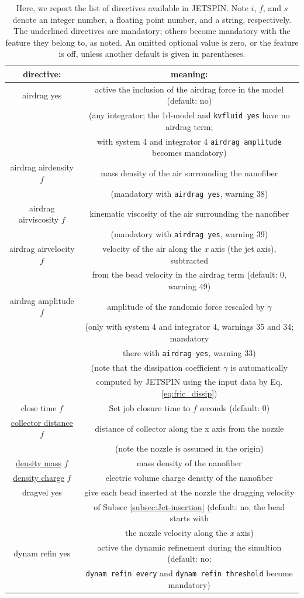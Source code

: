 \begin{longtable}{cc}
\caption{Here, we report the list of directives available in JETSPIN. Note
$i$, $f$, and $s$ denote an integer number, a floating point number,
and a string, respectively. The underlined directives are mandatory;
others become mandatory with the feature they belong to, as noted.
An omitted optional value is zero, or the feature is off, unless another
default is given in parentheses.}
\tabularnewline
\endlastfoot
\hline
\textbf{directive:}  & \textbf{meaning:}\tabularnewline
\hline
\hline
airdrag yes  & active the inclusion of the airdrag force in the model (default: no)\tabularnewline
 & (any integrator; the 1d-model and \texttt{kvfluid yes} have no airdrag term;\tabularnewline
 & with system 4 and integrator 4 \texttt{airdrag amplitude} becomes mandatory)\tabularnewline
airdrag airdensity $f$  & mass density of the air surrounding the nanofiber\tabularnewline
 & (mandatory with \texttt{airdrag yes}, warning 38)\tabularnewline
airdrag airviscosity $f$  & kinematic viscosity of the air surrounding the nanofiber\tabularnewline
 & (mandatory with \texttt{airdrag yes}, warning 39)\tabularnewline
airdrag airvelocity $f$  & velocity of the air along the \textit{x} axis (the jet axis), subtracted\tabularnewline
 & from the bead velocity in the airdrag term (default: 0, warning 49)\tabularnewline
airdrag amplitude $f$  & amplitude of the randomic force rescaled by $\gamma$\tabularnewline
 & (only with system 4 and integrator 4, warnings 35 and 34; mandatory\tabularnewline
 & there with \texttt{airdrag yes}, warning 33)\tabularnewline
 & (note that the dissipation coefficient $\gamma$ is automatically\tabularnewline
 & computed by JETSPIN using the input data by Eq. \ref{eq:fric_dissip})\tabularnewline
close time $f$ & Set job closure time to $f$ seconds (default: 0)\tabularnewline
\uline{collector distance} $f$  & distance of collector along the x axis from the nozzle\tabularnewline
 & \quad{}(note the nozzle is assumed in the origin)\tabularnewline
\uline{density mass} $f$  & mass density of the nanofiber\tabularnewline
\uline{density charge} $f$  & electric volume charge density of the nanofiber\tabularnewline
dragvel yes  & give each bead inserted at the nozzle the dragging velocity\tabularnewline
 & \quad{}of Subsec \ref{subsec:Jet-insertion} (default: no, the bead starts with\tabularnewline
 & \quad{}the nozzle velocity along the \textit{x} axis)\tabularnewline
dynam refin yes  & active the dynamic refinement during the simultion (default: no;\tabularnewline
 & \texttt{dynam refin every} and \texttt{dynam refin threshold} become mandatory)\tabularnewline

\end{longtable}
